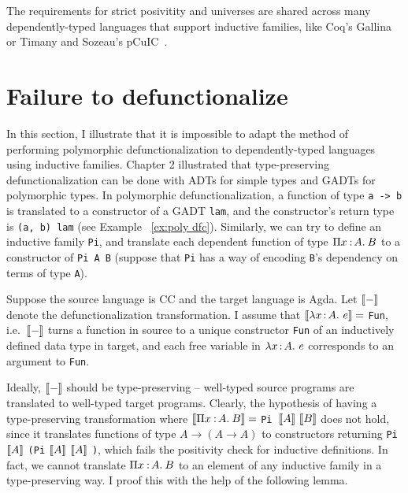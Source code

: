 The requirements for strict posivitity and universes are shared across many dependently-typed languages that support inductive families, like Coq's Gallina~\cite{CoqDoc} or Timany and Sozeau's pCuIC~\cite{DBLP:journals/corr/abs-1710-03912}. 

\section{Failure to defunctionalize}
\label{sec:3.2}

In this section, I illustrate that it is impossible to adapt the method of performing polymorphic defunctionalization to dependently-typed languages using inductive families. Chapter 2 illustrated that type-preserving defunctionalization can be done with ADTs for simple types and GADTs for polymorphic types. In polymorphic defunctionalization, a function of type \texttt{a -> b} is translated to a constructor of a GADT \texttt{lam}, and the constructor's return type is \texttt{(a, b) lam} (see Example ~\ref{ex:poly dfc}). Similarly, we can try to define an inductive family \texttt{Pi}, and translate each dependent function of type $\Pi x\mkern1.5mu{\hspace{0.5mm}{:}\hspace{0.5mm}} A.\hspace{0.8mm}B$ to a constructor of \texttt{Pi A B} (suppose that \texttt{Pi} has a way of encoding \texttt{B}'s dependency on terms of type \texttt{A}). 

Suppose the source language is CC and the target language is Agda. Let ${[\![ - ]\!]}$ denote the defunctionalization transformation. I assume that ${[\![ \lambda x\hspace{0.5mm}{:}\hspace{0.5mm} A.\ e ]\!]} =$ \texttt{Fun}, i.e.~${[\![ - ]\!]}$ turns a function in source to a unique constructor \texttt{Fun} of an inductively defined data type in target, and each free variable in $\lambda x\hspace{0.5mm}{:}\hspace{0.5mm} A.\ e$ corresponds to an argument to \texttt{Fun}. 

Ideally, ${[\![ - ]\!]}$ should be type-preserving -- well-typed source programs are translated to well-typed target programs. Clearly, the hypothesis of having a type-preserving transformation where ${[\![ \Pi x\mkern1.5mu{\hspace{0.5mm}{:}\hspace{0.5mm}} A.\hspace{0.8mm}B ]\!]} =$ \texttt{Pi }$\bbracket{A}\ \bbracket{B}$ does not hold, since it translates functions of type $A \rightarrow (A \rightarrow A)$ to constructors returning \texttt{Pi} ${[\![ A ]\!]}$ \texttt{(Pi} ${[\![ A ]\!]}$ ${[\![ A ]\!]}$ \texttt{)}, which fails the positivity check for inductive definitions. In fact, we cannot translate $\Pi x\mkern1.5mu{\hspace{0.5mm}{:}\hspace{0.5mm}} A.\hspace{0.8mm}B$ to an element of any inductive family in a type-preserving way. I proof this with the help of the following lemma.

